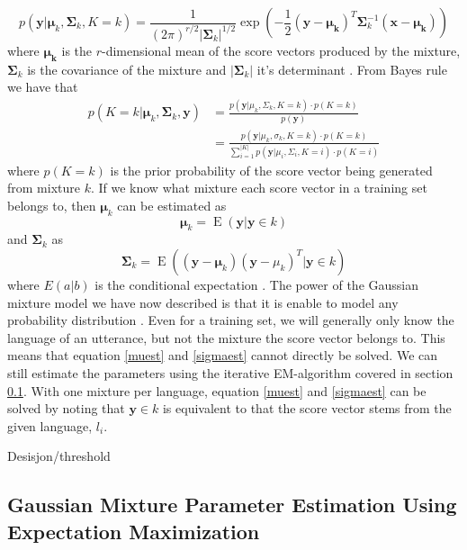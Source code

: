 \begin{equation}
\label{gmmeq}
p(\mathbf{y} | \mathbf{\mu}_k, \mathbf{\Sigma}_k, K = k) = \frac{1}{(2\pi)^{r/2}|\mathbf{\Sigma}_k|^{1/2}}\exp(-\frac{1}{2}(\mathbf{y}-\mathbf{\mu_k})^T\mathbf{\Sigma}_k^{-1}(\mathbf{x}-\mathbf{\mu_k}))
\end{equation}
where $\mathbf{\mu_k}$ is the $r$-dimensional mean of the score vectors produced by the mixture, $\mathbf{\Sigma}_k$ is the covariance of the mixture and $|\mathbf{\Sigma}_k|$ it's determinant \cite[p. 94]{talegk}. From Bayes rule we have that
\begin{align}
p(K=k | \mathbf{\mu}_k, \mathbf{\Sigma}_k, \mathbf{y}) &= 
\frac{p(\mathbf{y} | \mu_k, \Sigma_k, K= k) \cdot p(K=k )}{p(\mathbf{y})} \nonumber \\
&= \frac{p(\mathbf{y} | \mu_k, \sigma_k, K=k) \cdot p(K=k)}{\sum_{i = 1}^{|K|} p(\mathbf{y} | \mu_i, \Sigma_i, K=i) \cdot p(K=i)} \label{gmmchoose}
\end{align}
where $p(K=k)$ is the prior probability of the score vector being generated from mixture $k$. If we know what mixture each score vector in a training set belongs to, then $\mathbf{\mu}_k$ can be estimated as
\begin{equation}
\label{muest}
\mathbf{\mu}_k = \operatorname{E}(\mathbf{y} | \mathbf{y} \in k)
\end{equation}
and $\mathbf{\Sigma}_k$ as
\begin{equation}
\label{sigmaest}
\mathbf{\Sigma}_k = \operatorname{E}\left( (\mathbf{y}-\mathbf{\mu}_k)(\mathbf{y}-\mu_k)^T | \mathbf{y} \in k \right)
\end{equation}
where $E(a|b)$ is the conditional expectation \cite[p. 94]{talegk}. The power of the Gaussian mixture model we have now described is that it is enable to model any probability distribution \cite[p. 95]{talegk}. Even for a training set, we will generally only know the language of an utterance, but not the mixture the score vector belongs to. This means that equation \ref{muest} and \ref{sigmaest} cannot directly be solved. We can still estimate the parameters using the iterative EM-algorithm covered in section \ref{sect:emgmmest}. With one mixture per language, equation \ref{muest} and \ref{sigmaest} can be solved by noting that $\mathbf{y} \in k$ is equivalent to that the score vector stems from the given language, $l_i$.

Desisjon/threshold

\subsection{Gaussian Mixture Parameter Estimation Using Expectation Maximization}
\label{sect:emgmmest}

